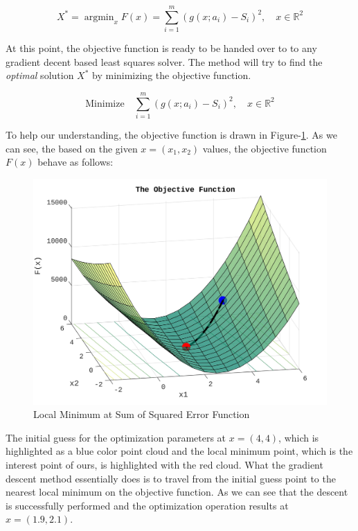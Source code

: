 \documentclass[a4paper]{report}
\numberwithin{figure}{section}
\newcommand{\argmin}{\mathop{\mathrm{argmin}}}
\newcommand{\R}{\mathbb{R}}
\begin{document}
\begin{equation}
X^* = \argmin_x F(x) = 
\sum_{i=1}^{m} (g(x;a_i) - S_i)^2, 
\quad x \in \R^2
\label{eq}
\end{equation}

At this point, the objective function is ready to be handed over to 
to any gradient decent based least squares solver. The method will try to find the
\textit{optimal} solution $X^*$ by minimizing the objective function.

\begin{equation}
\text{Minimize} \quad \sum_{i=1}^{m} (g(x;a_i) - S_i)^2, 
\quad x \in \R^2
\label{eq}
\end{equation}

To help our understanding, the objective function is drawn in
Figure-\ref{fig:lsq_sum_of_squared_error_function}.
As we can see, the based on the given $x=(x_1,x_2)$ values, 
the objective
function $F(x)$ behave as follows:

\begin{figure}[H]
	\centering
	\includegraphics[width=\linewidth,natwidth=640,natheight=640]
	{fig/lsq_sum_of_squared_error_function_v2.jpg}
	\caption{Local Minimum at Sum of Squared Error Function}
	\label{fig:lsq_sum_of_squared_error_function}
\end{figure}

The initial guess for the optimization parameters at $x=(4,4)$, which
is highlighted as a blue color point cloud and 
the local minimum point, which is the interest point of ours, 
is highlighted with the red cloud. What the gradient descent method essentially 
does is to travel from the initial guess point to the nearest local minimum 
on the objective function. As we can see
that the descent is successfully performed and the optimization
operation results at $x=(1.9,2.1)$. 
\end{document}
